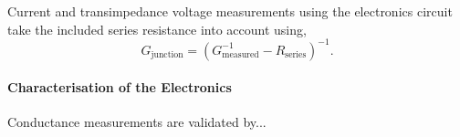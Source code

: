 \documentclass{article}
\begin{document}
Current and transimpedance voltage measurements using the electronics circuit take the included series resistance into account using,
\begin{equation}
G_{\mathrm{junction}} = \left(G_{\mathrm{measured}}^{-1} - R_{\mathrm{series}}\right)^{-1}.
\end{equation}

\paragraph{Characterisation of the Electronics}

Conductance measurements are validated by...

\FloatBarrier
\end{document}
